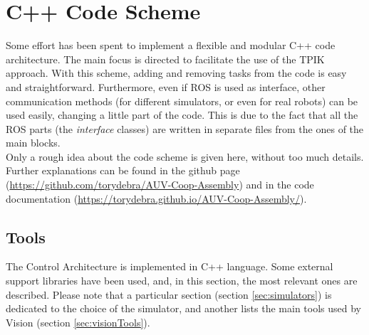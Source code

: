 

\chapter{C++ Code Scheme}
\label{chap:AppendixCode}
\ifpdf
\graphicspath{{Appendix/Figures/PNG/}{Appendix/Figures/PDF/}{Appendix/Figures/}}
\else
\graphicspath{{Appendix/Figures/EPS/}{Appendix/Figures/}}
\fi

Some effort has been spent to implement a flexible and modular C++ code architecture. The main focus is directed to facilitate the use of the TPIK approach. With this scheme, adding and removing tasks from the code is easy and straightforward. Furthermore, even if ROS is used as interface, other communication methods (for different simulators, or even for real robots) can be used easily, changing a little part of the code. This is due to the fact that all the ROS parts (the \textit{interface} classes) are written in separate files from the ones of the main blocks.\\
Only a rough idea about the code scheme is given here, without too much details. Further explanations can be found in the github page (\url{https://github.com/torydebra/AUV-Coop-Assembly}) and in the code documentation (\url{https://torydebra.github.io/AUV-Coop-Assembly/}).

\section{Tools}
The Control Architecture is implemented in C++ language. Some external support libraries have been used, and, in this section, the most relevant ones are described. Please note that a particular section (section \ref{sec:simulators}) is dedicated to the choice of the simulator, and another lists the main tools used by Vision (section \ref{sec:visionTools}).

